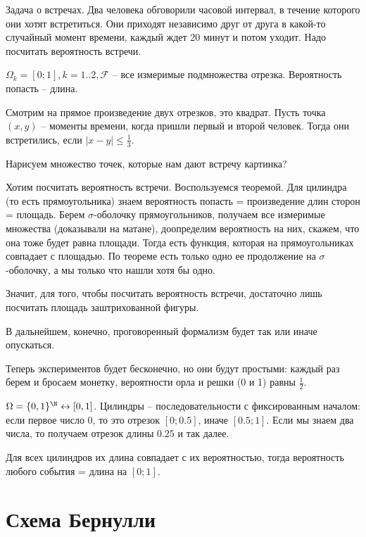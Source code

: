 \begin{exmp}
Задача о встречах. Два человека обговорили часовой интервал, в течение которого они хотят встретиться. 
Они приходят независимо друг от друга в какой-то случайный момент времени, каждый ждет 20 минут и потом уходит.
Надо посчитать вероятность встречи.

$\Omega_k = [0; 1], k = 1..2, \mathcal{F}$ -- все измеримые подмножества отрезка. Вероятность попасть -- длина.

Смотрим на прямое произведение двух отрезков, это квадрат.
Пусть точка $(x, y)$ -- моменты времени, когда пришли первый и второй человек. 
Тогда они встретились, если $|x - y| \leq \frac13$. 

Нарисуем множество точек, которые нам дают встречу \TODO картинка? \TODO

Хотим посчитать вероятность встречи. Воспользуемся теоремой. Для цилиндра (то есть прямоугольника) знаем вероятность попасть = произведение длин сторон = площадь.
Берем $\sigma$-оболочку прямоугольников, получаем все измеримые множества (доказывали на матане), доопределим вероятность на них, скажем, что она тоже будет равна площади. 
Тогда есть функция, которая на прямоугольниках совпадает с площадью. 
По теореме есть только одно ее продолжение на $\sigma$-оболочку, а мы только что нашли хотя бы одно.

Значит, для того, чтобы посчитать вероятность встречи, достаточно лишь посчитать площадь заштрихованной фигуры.
\end{exmp}

\begin{Rem}
В дальнейшем, конечно, проговоренный формализм будет так или иначе опускаться.
\end{Rem}

\begin{exmp}
Теперь экспериментов будет бесконечно, но они будут простыми: каждый раз берем и бросаем монетку, вероятности орла и решки (0 и 1) равны $\frac12$.

$\Omega = \{0, 1\}^{\N} \leftrightarrow [0, 1]$.
Цилиндры -- последовательности с фиксированным началом: если первое число 0, то это отрезок $[0; 0.5]$, иначе $[0.5; 1]$.
Если мы знаем два числа, то получаем отрезок длины $0.25$ и так далее.

Для всех цилиндров их длина совпадает с их вероятностью, тогда вероятность любого события = длина на $[0; 1]$.
\end{exmp}

\section{Схема Бернулли}

